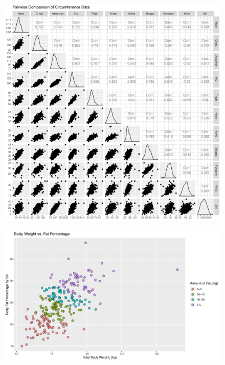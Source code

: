 \documentclass[11pt,american,czech]{article}
\begin{document}
\begin{figure}[ht!]
	\centering
	\includegraphics[width=1.0\linewidth]{Images/FIGURES/pairwise_comparison}
	\caption{}
	\label{fig:pairwise_comparison}
\end{figure}

\begin{figure}[ht!]
	\centering
	\includegraphics[width=1.0\linewidth]{Images/FIGURES/total_weight_vs_siri}
	\caption{}
	\label{fig:total_weight_vs_siri}
\end{figure}
\end{document}

